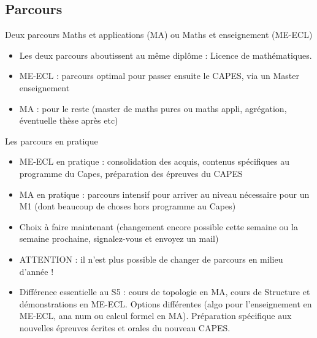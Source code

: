 \documentclass{beamer}
\begin{document}


\subsection{Parcours}
\begin{frame}
\begin{block}{Deux parcours}
Maths et applications (MA) ou Maths et enseignement (ME-ECL)
\begin{itemize}
\item Les deux parcours aboutissent au même diplôme : Licence de mathématiques.
\item ME-ECL : parcours optimal pour passer ensuite le CAPES, via un Master enseignement
\item MA : pour le reste (master de maths pures ou maths appli, agrégation, éventuelle thèse après etc)
\end{itemize}
\end{block}
\end{frame}

\begin{frame}
\begin{block}{Les parcours en pratique}
\begin{itemize}
\item ME-ECL en pratique : consolidation des acquis, contenus spécifiques au programme du Capes, préparation des épreuves du CAPES
\item MA en pratique : parcours intensif pour arriver au niveau nécessaire pour un M1 (dont beaucoup de choses hors programme au Capes)
\item Choix à faire maintenant (changement encore possible cette semaine ou la semaine prochaine, signalez-vous et envoyez un mail)
\item ATTENTION : il n'est plus possible de changer de parcours en milieu d'année !
\item Différence essentielle au S5 : cours de topologie en MA, cours de Structure et démonstrations en ME-ECL. Options différentes (algo pour l'enseignement en ME-ECL, ana num ou calcul formel en MA). Préparation spécifique aux nouvelles épreuves écrites et orales du nouveau CAPES.
\end{itemize}
\end{block}
\end{frame}
\end{document}
